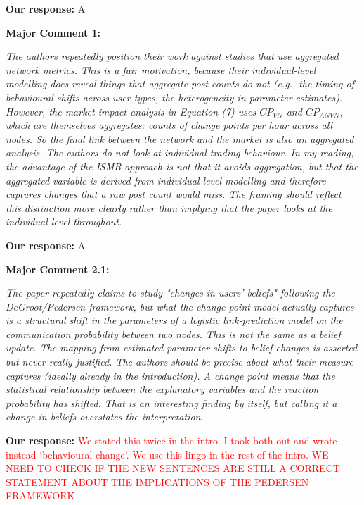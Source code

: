 \documentclass[11pt]{article}
\newcommand{\reviewercomment}[1]{\begin{commentbox}\textit{#1}\end{commentbox}}
\newcommand{\ourresponse}[1]{\textbf{Our response:} #1}
\begin{document}
\ourresponse{A
}

\bigskip

\textbf{Major Comment 1:}

\reviewercomment{%
	The authors repeatedly position their work against studies that use aggregated network metrics. This is a fair motivation, because their individual-level modelling does reveal things that aggregate post counts do not (e.g., the timing of behavioural shifts across user types, the heterogeneity in parameter estimates). However, the market-impact analysis in Equation (7) uses $CP_{VN}$ and $CP_{ANVN}$, which are themselves aggregates: counts of change points per hour across all nodes. So the final link between the network and the
	market is also an aggregated analysis. The authors do not look at individual trading behaviour. In my reading, the advantage of the ISMB approach is not that it avoids aggregation, but
	that the aggregated variable is derived from individual-level modelling and therefore captures changes that a raw post count would miss. The framing should reflect this distinction more clearly rather than implying that the paper looks at the individual level throughout.
}

\ourresponse{
	A
}

\bigskip

\textbf{Major Comment 2.1:}

\reviewercomment{%
	The paper repeatedly claims to study "changes in users' beliefs" following the DeGroot/Pedersen framework, but what the change point model actually captures is a structural shift in the parameters of a logistic link-prediction model on the communication probability between two nodes. This is not the same as a belief update. The mapping from estimated parameter shifts to belief changes is asserted but never really justified. The authors should be precise about what their measure captures (ideally already in the introduction). A change point means that the statistical relationship between the explanatory variables and the reaction probability has shifted. That is an interesting finding by itself, but calling it a change in beliefs overstates the interpretation. 
}

\ourresponse{
	\textcolor{red}{We stated this twice in the intro. I took both out and wrote instead `behavioural change'. We use this lingo in the rest of the intro. WE NEED TO CHECK IF THE NEW SENTENCES ARE STILL A CORRECT STATEMENT ABOUT THE IMPLICATIONS OF THE PEDERSEN FRAMEWORK}
}
\end{document}
